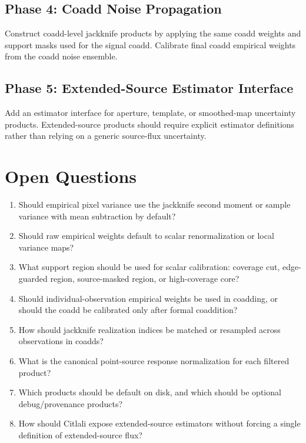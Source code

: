 \documentclass[11pt]{article}
\begin{document}
\subsection{Phase 4: Coadd Noise Propagation}

Construct coadd-level jackknife products by applying the same coadd weights and
support masks used for the signal coadd. Calibrate final coadd empirical
weights from the coadd noise ensemble.

\subsection{Phase 5: Extended-Source Estimator Interface}

Add an estimator interface for aperture, template, or smoothed-map uncertainty
products. Extended-source products should require explicit estimator
definitions rather than relying on a generic source-flux uncertainty.

\section{Open Questions}

\begin{enumerate}[leftmargin=1.5em]
\item Should empirical pixel variance use the jackknife second moment or
sample variance with mean subtraction by default?
\item Should raw empirical weights default to scalar renormalization or local
variance maps?
\item What support region should be used for scalar calibration: coverage cut,
edge-guarded region, source-masked region, or high-coverage core?
\item Should individual-observation empirical weights be used in coadding, or
should the coadd be calibrated only after formal coaddition?
\item How should jackknife realization indices be matched or resampled across
observations in coadds?
\item What is the canonical point-source response normalization for each
filtered product?
\item Which products should be default on disk, and which should be optional
debug/provenance products?
\item How should Citlali expose extended-source estimators without forcing a
single definition of extended-source flux?
\end{enumerate}
\end{document}
